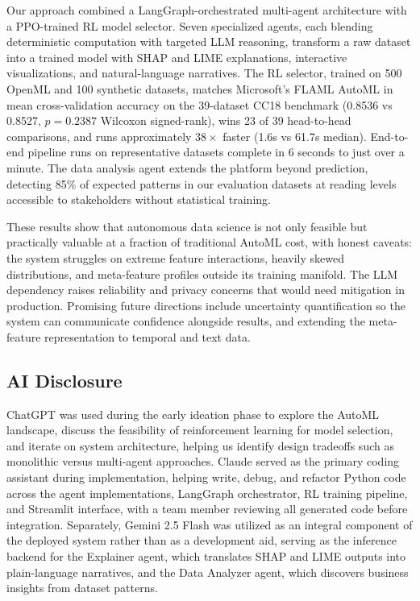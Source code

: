 \documentclass{article}
\begin{document}
Our approach combined a LangGraph-orchestrated multi-agent architecture with a PPO-trained RL model selector. Seven specialized agents, each blending deterministic computation with targeted LLM reasoning, transform a raw dataset into a trained model with SHAP and LIME explanations, interactive visualizations, and natural-language narratives. The RL selector, trained on 500 OpenML and 100 synthetic datasets, matches Microsoft's FLAML AutoML in mean cross-validation accuracy on the 39-dataset CC18 benchmark (0.8536 vs 0.8527, $p = 0.2387$ Wilcoxon signed-rank), wins 23 of 39 head-to-head comparisons, and runs approximately $38\times$ faster (1.6s vs 61.7s median). End-to-end pipeline runs on representative datasets complete in 6 seconds to just over a minute. The data analysis agent extends the platform beyond prediction, detecting 85\% of expected patterns in our evaluation datasets at reading levels accessible to stakeholders without statistical training.

These results show that autonomous data science is not only feasible but practically valuable at a fraction of traditional AutoML cost, with honest caveats: the system struggles on extreme feature interactions, heavily skewed distributions, and meta-feature profiles outside its training manifold. The LLM dependency raises reliability and privacy concerns that would need mitigation in production. Promising future directions include uncertainty quantification so the system can communicate confidence alongside results, and extending the meta-feature representation to temporal and text data.

\subsection{AI Disclosure}

ChatGPT was used during the early ideation phase to explore the AutoML landscape, discuss the feasibility of reinforcement learning for model selection, and iterate on system architecture, helping us identify design tradeoffs such as monolithic versus multi-agent approaches. Claude served as the primary coding assistant during implementation, helping write, debug, and refactor Python code across the agent implementations, LangGraph orchestrator, RL training pipeline, and Streamlit interface, with a team member reviewing all generated code before integration. Separately, Gemini 2.5 Flash was utilized as an integral component of the deployed system rather than as a development aid, serving as the inference backend for the Explainer agent, which translates SHAP and LIME outputs into plain-language narratives, and the Data Analyzer agent, which discovers business insights from dataset patterns.
\end{document}
